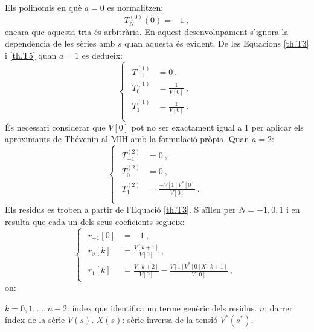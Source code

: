 Els polinomis en què $a=0$ es normalitzen:
\begin{equation}
T^{(0)}_N(0)=-1\ ,
\label{th.T6}
\end{equation}
encara que aquesta tria és arbitrària. En aquest desenvolupament s'ignora la dependència de les sèries amb $s$ quan aquesta és evident. De les Equacions \ref{th.T3} i \ref{th.T5} quan $a=1$ es dedueix:
\begin{equation}
    \begin{cases}
\begin{split}
T^{(1)}_{-1}&=0\ ,\\
T^{(1)}_{0}&=\frac{1}{V[0]}\ ,\\
T^{(1)}_{1}&=\frac{1}{V[0]}\ .\\
\end{split}
\end{cases}
\label{th.T7}
\end{equation}
És necessari considerar que $V[0]$ pot no ser exactament igual a 1 per aplicar els aproximants de Thévenin al MIH amb la formulació pròpia. Quan $a=2$:
\begin{equation}
    \begin{cases}
    \begin{split}
    T^{(2)}_{-1}&=0\ ,\\
    T^{(2)}_{0}&=0\ ,\\
    T^{(2)}_{1}&=\frac{-V[1]V^*[0]}{V[0]}\ .\\
    \end{split}
\end{cases}
    \label{th.T8}
\end{equation}
Els residus es troben a partir de l'Equació \ref{th.T3}. S'aïllen per $N=-1, 0, 1$ i en resulta que cada un dels seus coeficients segueix:
\begin{equation}
    \begin{cases}
    \begin{split}
    r_{-1}[0]&=-1\ ,\\
    r_0[k]&=\frac{V[k+1]}{V[0]}\ ,\\
    r_1[k]&=\frac{V[k+2]}{V[0]}-\frac{V[1]V^*[0]X[k+1]}{V[0]}\ ,
    \end{split}
\end{cases}
    \label{th.T9}
\end{equation}
on:

$k=0,1,...,n-2$: índex que identifica un terme genèric dels residus. 
\vs
$n$: darrer índex de la sèrie $V(s)$. 
\vs
$X(s)$: sèrie inversa de la tensió $V^*(s^*)$. 

